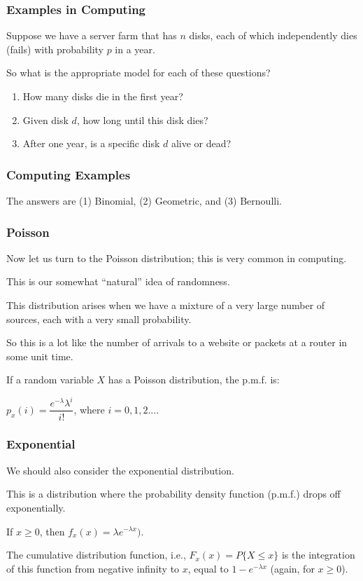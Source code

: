 \begin{frame}
\frametitle{Examples in Computing}

Suppose we have a server farm that has $n$ disks, each of which independently dies (fails) with probability $p$ in a year. 

So what is the appropriate model for each of these questions?

\begin{enumerate}
	\item How many disks die in the first year?
	\item Given disk $d$, how long until this disk dies?
	\item After one year, is a specific disk $d$ alive or dead?
\end{enumerate}

\end{frame}



\begin{frame}
\frametitle{Computing Examples}

The answers are (1) Binomial, (2) Geometric, and (3) Bernoulli.

\end{frame}



\begin{frame}
\frametitle{Poisson}

Now let us turn to the Poisson distribution; this is very common in computing. 

This is our somewhat ``natural'' idea of randomness. 

This distribution arises when we have a mixture of a very large number of sources, each with a very small probability. 

So this is a lot like the number of arrivals to a website or packets at a router in some unit time. 

If a random variable $X$ has a Poisson distribution, the p.m.f. is:

\begin{center}
	$p_{x}(i) = \dfrac{e^{-\lambda}\lambda^{i}}{i!}$, where $i = 0, 1, 2....$
\end{center}

\end{frame}



\begin{frame}
\frametitle{Exponential}

We should also consider the exponential distribution. 

This is a distribution where the probability density function (p.m.f.) drops off exponentially. 

If $x \geq 0$, then $f_{x}(x) = \lambda e^{-\lambda x})$. 

The cumulative distribution function, i.e., $F_{x}(x) = P\{ X \leq x \}$ is the integration of this function from negative infinity to $x$, equal to $1-e^{-\lambda x}$ (again, for $x \geq 0$). 

\end{frame}



